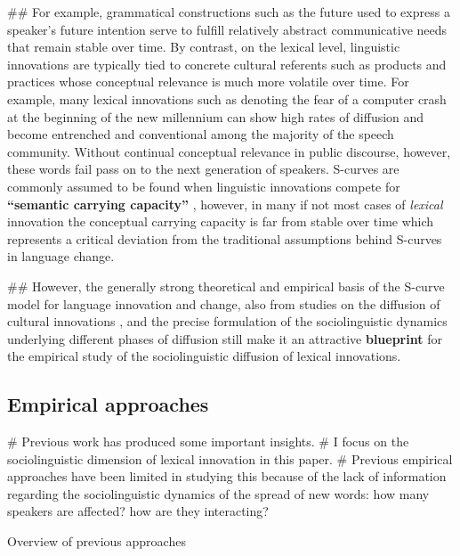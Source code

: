 \documentclass[
  a4paper,
  ]{scrartcl}
\renewcommand{\hw}[1]{\textbf{#1}}
\begin{document}
\begin{easylist}[itemize]
        ## For example, grammatical constructions such as the  future used to express a speaker's future intention serve to fulfill relatively abstract communicative needs that remain stable over time. By contrast, on the lexical level, linguistic innovations are typically tied to concrete cultural referents such as products and practices whose conceptual relevance is much more volatile over time. For example, many lexical innovations such as  denoting the fear of a computer crash at the beginning of the new millennium can show high rates of diffusion and become entrenched and conventional among the majority of the speech community. Without continual conceptual relevance in public discourse, however, these words fail pass on to the next generation of speakers. S-curves are commonly assumed to be found when linguistic innovations compete for \hw{\enquote{semantic carrying capacity}} \parencite{Nini2017}, however, in many if not most cases of \emph{lexical} innovation the conceptual carrying capacity is far from stable over time which represents a critical deviation from the traditional assumptions behind S-curves in language change.

        ## However, the generally strong theoretical and empirical basis of the S-curve model for language innovation and change, also from studies on the diffusion of cultural innovations \parencite{Rogers1962}, and the precise formulation of the sociolinguistic dynamics underlying different phases of diffusion still make it an attractive \hw{blueprint} for the empirical study of the sociolinguistic diffusion of lexical innovations.

    \end{easylist}

  \subsection{Empirical approaches}

    \begin{easylist}[itemize]
      # Previous work has produced some important insights.
      # I focus on the sociolinguistic dimension of lexical innovation in this paper.
      # Previous empirical approaches have been limited in studying this because of the lack of information regarding the sociolinguistic dynamics of the spread of new words: how many speakers are affected? how are they interacting?
    \end{easylist}

    Overview of previous approaches
\end{document}
